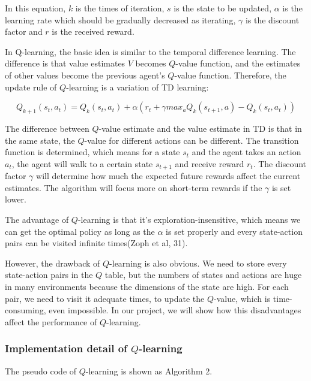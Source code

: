 \documentclass[14pt]{extarticle}
\begin{document}
In this equation, $k$ is the times of iteration, $s$ is the state to be updated, $\alpha$ is the learning rate which should be gradually decreased as iterating, $\gamma$ is the discount factor and $r$ is the received reward.

In Q-learning, the basic idea is similar to the temporal difference learning. The difference is that value estimates $V$ becomes $Q$-value function, and the estimates of other values become the previous agent's $Q$-value function. Therefore, the update rule of $Q$-learning is a variation of TD learning:

$$Q_{k+1}(s_t, a_t) = Q_{k}(s_t, a_t) + \alpha(r_t + \gamma max_{a}Q_k(s_{t+1},a) - Q_k(s_t, a_t))$$

The difference between $Q$-value estimate and the value estimate in TD is that in the same state, the $Q$-value for different actions can be different. The transition function is determined, which means for a state $s_t$ and the agent takes an action $a_t$, the agent will walk to a certain state $s_{t+1}$ and receive reward $r_t$. The discount factor $\gamma$ will determine how much the expected future rewards affect the current estimates. The algorithm will focus more on short-term rewards if the $\gamma$ is set lower. 

The advantage of $Q$-learning is that it's exploration-insensitive, which means we can get the optimal policy as long as the $\alpha$ is set properly and every state-action pairs can be visited infinite times(Zoph et al, 31).

However, the drawback of $Q$-learning is also obvious. We need to store every state-action pairs in the $Q$ table, but the numbers of states and actions are huge in many environments because the dimensions of the state are high. For each pair, we need to visit it adequate times, to update the $Q$-value, which is time-consuming, even impossible. In our project, we will show how this disadvantages affect the performance of $Q$-learning.

\subsubsection*{\small Implementation detail of $Q$-learning}

The pseudo code of $Q$-learning is shown as Algorithm 2.
\end{document}
